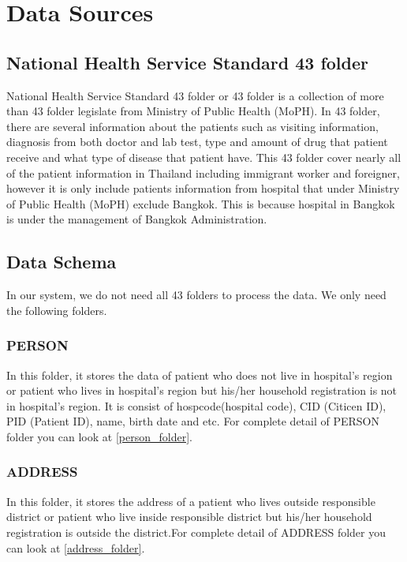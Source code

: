 \chapter{Data Sources}
\section{National Health Service Standard 43 folder}
    National Health Service Standard 43 folder or 43 folder is a collection of more than 43 folder legislate from Ministry of Public Health (MoPH). In 43 folder, there are several information about the patients such as visiting information, diagnosis from both doctor and lab test, type and amount of drug that patient receive and what type of disease that patient have. This 43 folder cover nearly all of the patient information in Thailand including immigrant worker and foreigner, however it is only include patients information from hospital that under Ministry of Public Health (MoPH) exclude Bangkok. This is because hospital in Bangkok is under the management of Bangkok Administration.
    
\section{Data Schema}
    In our system, we do not need all 43 folders to process the data. We only need the following folders.
    
    
    \subsection{PERSON}
        In this folder, it stores the data of patient who does not live in hospital's region or patient who lives in hospital's region but his/her household registration is not in hospital's region. It is consist of hospcode(hospital code), CID (Citicen ID), PID (Patient ID), name, birth date and etc. For complete detail of PERSON folder you can look at \ref{person_folder}.
    
    \subsection{ADDRESS}
        In this folder, it stores the address of a patient who lives outside responsible district or patient who live inside responsible district but his/her household registration is outside the district.For complete detail of ADDRESS folder you can look at \ref{address_folder}.
        
